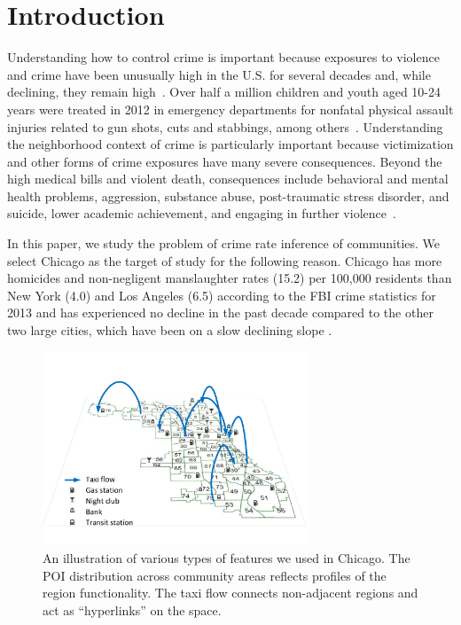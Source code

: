 
\section{Introduction}

Understanding how to control crime is important because exposures to violence and crime have been unusually high in the U.S. for several decades and, while declining, they remain high~\cite{Baum05, Fink08}. Over half a million children and youth aged 10-24 years were treated in 2012 in emergency departments for nonfatal physical assault injuries related to gun shots, cuts and stabbings, among others~\cite{cdc15}.  Understanding the neighborhood context of crime is particularly important because victimization and other forms of crime exposures have many severe consequences.  Beyond the high medical bills and violent death, consequences include behavioral and mental health problems, aggression, substance abuse, post-traumatic stress disorder, and suicide, lower academic achievement, and engaging in further violence~\cite{Grai15}. 

In this paper, we study the problem of crime rate inference of communities. We select Chicago as the target of study for the following reason. Chicago has more homicides and non-negligent manslaughter rates (15.2)
per 100,000 residents than New York (4.0) and Los Angeles (6.5)
according to the FBI crime statistics for 2013 and has experienced no
decline in the past decade compared to the other two large cities,
which have been on a slow declining slope \cite{crime-stats}.


\begin{figure}[t]
\centering
\includegraphics[width=0.7\textwidth]{fig/demo-kdd16.pdf}
\vspace{-5mm}
\caption{An illustration of various types of features we used in Chicago. The POI distribution across community areas reflects profiles of the region functionality. The taxi flow connects non-adjacent regions and act as ``hyperlinks'' on the space.}
\label{fig:demo}
\vspace{-6mm}
\end{figure}

